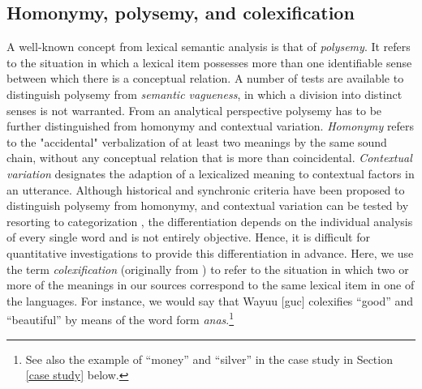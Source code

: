 \subsection{Homonymy, polysemy, and colexification}
A well-known concept from lexical semantic analysis is that of \emph{polysemy}. It refers to the situation
in which a lexical item possesses more than one identifiable sense between which there is a
conceptual relation. A number of tests are available to distinguish polysemy from \emph{semantic
vagueness}, in which a division into distinct senses is not warranted. From an analytical perspective
polysemy has to be further distinguished from {homonymy} and contextual variation.
\emph{Homonymy} refers to
the "accidental" verbalization of at least two meanings by the same sound chain, without any
conceptual relation that is more than coincidental. \emph{Contextual variation}
designates the adaption of a lexicalized meaning to contextual factors in an utterance. Although
historical and synchronic criteria have been proposed to distinguish polysemy from homonymy, and
contextual variation can be tested by resorting to categorization \cite{blank1997}, the
differentiation depends on the individual analysis of every single word and is not entirely
objective. Hence, it is difficult for quantitative investigations to provide this differentiation
in advance.
Here, we use the term \textit{colexification} (originally from )
to refer to the situation
in which two or more of the meanings in our sources correspond to the same lexical item in one of
the languages. For instance, we would say that Wayuu [guc] colexifies ``good'' and ``beautiful'' by means of the word form \textit{anas\textbari}.\footnote{See also the example of ``money'' and ``silver'' in the case study in Section \ref{case study} below.}
